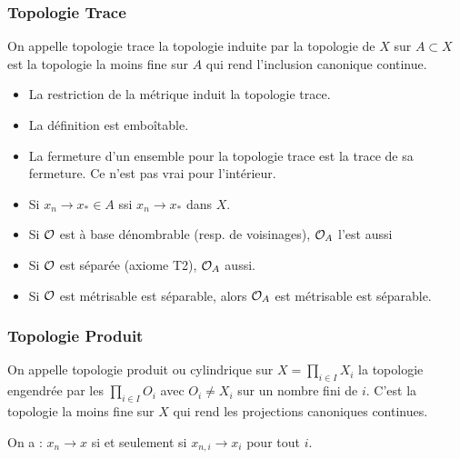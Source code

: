 \documentclass{cours}
\begin{document}
\subsubsection{Topologie Trace}
\begin{definition}
    On appelle topologie trace la topologie induite par la topologie de $X$ sur $A \subset X$ est la topologie la moins fine sur $A$ qui rend l'inclusion canonique continue.
\end{definition}
\begin{proposition}
    \begin{itemize}
        \item La restriction de la métrique induit la topologie trace.
        \item La définition est emboîtable.
        \item La fermeture d'un ensemble pour la topologie trace est la trace de sa fermeture. Ce n'est pas vrai pour l'intérieur.
        \item Si $x_{n} \rightarrow x_{*}\in A$ ssi $x_{n} \rightarrow x_{*}$ dans $X$.
    \end{itemize}
    \begin{itemize}
        \item Si $\mathcal{O}$ est à base dénombrable (resp. de voisinages), $\mathcal{O}_{A}$ l'est aussi
        \item Si $\mathcal{O}$ est séparée (axiome T2), $\mathcal{O}_{A}$ aussi.
        \item Si $\mathcal{O}$ est métrisable est séparable, alors $\mathcal{O}_{A}$ est métrisable est séparable.
    \end{itemize}    
\end{proposition}

\subsubsection{Topologie Produit}
\begin{definition}
    On appelle topologie produit ou cylindrique sur $X = \prod_{i \in I} X_{i}$ la topologie engendrée par les $\prod_{i \in I}O_{i}$ avec $O_{i} \neq X_{i}$ sur un nombre fini de $i$. C'est la topologie la moins fine sur $X$ qui rend les projections canoniques continues.
\end{definition}
\begin{lemma}
    On a : $x_{n} \to x$ si et seulement si $x_{n, i} \to x_{i}$ pour tout $i$.
\end{lemma}
\end{document}

